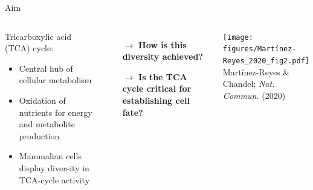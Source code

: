 \documentclass[10pt, aspectratio=169]{beamer}
\begin{document}
\begin{frame}{Aim}
\begin{columns}

\begin{block}{\centering Tricarboxylic acid (TCA) cycle:}
\vspace{0.2cm}
    \begin{itemize}
        \item Central hub of cellular metabolism \\[0.1cm]
        \item Oxidation of nutrients for energy and metabolite production \\[0.1cm]
        \item Mammalian cells display diversity in TCA-cycle activity \\[0.1cm]
    \end{itemize}
\vspace{0.2cm}
\end{block}

\vspace{0.6cm}

\begin{itemize}
    \item[$\rightarrow$] \textbf{How is this diversity achieved?} \\[0.3cm]
    \item[$\rightarrow$] \textbf{Is the TCA cycle critical for establishing cell fate?}
\end{itemize}

\centering
\texttt{[image: figures/Martínez-Reyes\_2020\_fig2.pdf]}\\[0.1cm]
\tiny{Martínez-Reyes \& Chandel; \textit{Nat. Commun.} (2020)}
\end{columns}
\end{frame}
\end{document}

